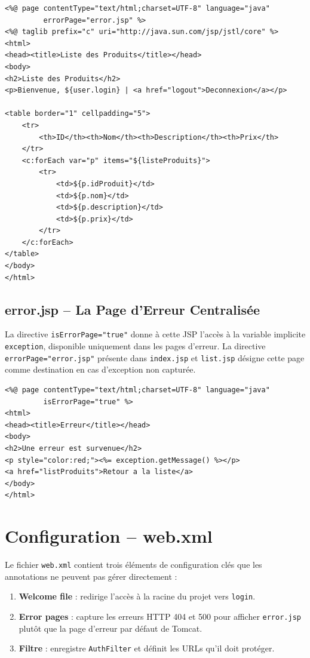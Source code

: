 \documentclass[12pt, a4paper]{article}
\begin{document}
\begin{lstlisting}[style=jspstyle, caption=webapp/list.jsp]
<%@ page contentType="text/html;charset=UTF-8" language="java"
         errorPage="error.jsp" %>
<%@ taglib prefix="c" uri="http://java.sun.com/jsp/jstl/core" %>
<html>
<head><title>Liste des Produits</title></head>
<body>
<h2>Liste des Produits</h2>
<p>Bienvenue, ${user.login} | <a href="logout">Deconnexion</a></p>

<table border="1" cellpadding="5">
    <tr>
        <th>ID</th><th>Nom</th><th>Description</th><th>Prix</th>
    </tr>
    <c:forEach var="p" items="${listeProduits}">
        <tr>
            <td>${p.idProduit}</td>
            <td>${p.nom}</td>
            <td>${p.description}</td>
            <td>${p.prix}</td>
        </tr>
    </c:forEach>
</table>
</body>
</html>
\end{lstlisting}

\subsection{error.jsp -- La Page d'Erreur Centralisée}

La directive \texttt{isErrorPage="true"} donne à cette JSP l'accès à la variable implicite \texttt{exception}, disponible uniquement dans les pages d'erreur. La directive \texttt{errorPage="error.jsp"} présente dans \texttt{index.jsp} et \texttt{list.jsp} désigne cette page comme destination en cas d'exception non capturée.

\begin{lstlisting}[style=jspstyle, caption=webapp/error.jsp]
<%@ page contentType="text/html;charset=UTF-8" language="java"
         isErrorPage="true" %>
<html>
<head><title>Erreur</title></head>
<body>
<h2>Une erreur est survenue</h2>
<p style="color:red;"><%= exception.getMessage() %></p>
<a href="listProduits">Retour a la liste</a>
</body>
</html>
\end{lstlisting}

\section{Configuration -- web.xml}

Le fichier \texttt{web.xml} contient trois éléments de configuration clés que les annotations ne peuvent pas gérer directement :

\begin{enumerate}
    \item \textbf{Welcome file} : redirige l'accès à la racine du projet vers \texttt{login}.
    \item \textbf{Error pages} : capture les erreurs HTTP 404 et 500 pour afficher \texttt{error.jsp} plutôt que la page d'erreur par défaut de Tomcat.
    \item \textbf{Filtre} : enregistre \texttt{AuthFilter} et définit les URLs qu'il doit protéger.
\end{enumerate}
\end{document}
